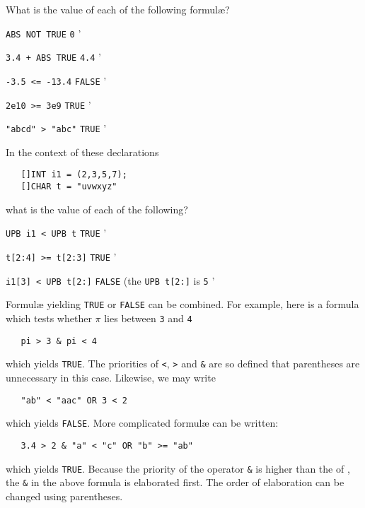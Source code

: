 \begin{exercise}
\item What is the value of each of the following formul{\ae}?
\begin{subex}
\item \verb|ABS NOT TRUE| \subans \verb|0|
'
\item \verb|3.4 + ABS TRUE| \subans \verb|4.4|
'
\item \verb|-3.5 <= -13.4| \subans \verb|FALSE|
'
\item \verb|2e10 >= 3e9| \subans \verb|TRUE|
'
\item \verb|"abcd" > "abc"| \subans \verb|TRUE|
'
\end{subex}
\item In the context of these declarations
\begin{verbatim}
   []INT i1 = (2,3,5,7);
   []CHAR t = "uvwxyz"
\end{verbatim}
\noindent
what is the value of each of the following?
\begin{subex}
\item \verb|UPB i1 < UPB t| \subans \verb|TRUE|
'
\item \verb|t[2:4] >= t[2:3]| \subans \verb|TRUE|
'
\item \verb|i1[3] < UPB t[2:]| \subans \verb|FALSE| (the
\verb|UPB t[2:]| is \verb|5|
'
\end{subex}
\end{exercise}

Formul{\ae} yielding \verb|TRUE| or \verb|FALSE| can be combined. For
example, here is a formula which tests whether $\pi$ lies between
\verb|3| and \verb|4|
\begin{verbatim}
   pi > 3 & pi < 4
\end{verbatim}
\noindent
which yields \verb|TRUE|. The priorities of \verb|<|, \verb|>| and
\verb|&| are so defined that parentheses are unnecessary in this
case.  Likewise, we may write
\begin{verbatim}
   "ab" < "aac" OR 3 < 2
\end{verbatim}
\noindent
which yields \verb|FALSE|. More complicated formul{\ae} can be
written:
\begin{verbatim}
   3.4 > 2 & "a" < "c" OR "b" >= "ab"
\end{verbatim}
\noindent
which yields \verb|TRUE|. Because the priority of the operator
\verb|&| is higher than the  of , the \verb|&|
in the above formula is elaborated first. The order of elaboration
can be changed using parentheses.

